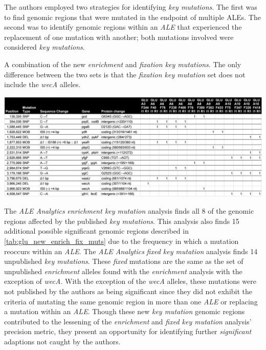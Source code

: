 \documentclass[12pt,final,masters,chapterheads]{ucsd}  %
\begin{document}
The authors employed two strategies for identifying \textit{key mutations}. The first was to find genomic regions that were mutated in the endpoint of multiple ALEs.
The second was to identify genomic regions within an \textit{ALE} that experienced the replacement of one mutation with another; both mutations involved were considered \textit{key mutations}.
\begin{table}[H]
  \caption{A combination of the new \textit{enrichment} and \textit{fixation key mutations}. The only difference between the two sets is that the \textit{fixation key mutation} set does not include the \textit{wecA} alleles.}
  \centering
  \includegraphics[width=\textwidth]{glu_new_enrich_fix_muts.png}
  \label{tab:glu_new_enrich_fix_muts}
\end{table}
The \textit{ALE Analytics }\textit{enrichment key mutation} analysis finds all 8 of the genomic regions affected by the published \textit{key mutations}. This analysis also finds 15 additional possible significant genomic regions described in \ref{tab:glu_new_enrich_fix_muts} due to the frequency in which a mutation reoccurs within an \textit{ALE}. The \textit{ALE Analytics} \textit{fixed key mutation} analysis finds 14 unpublished \textit{key mutations}. These \textit{fixed} mutations are the same as the set of unpublished \textit{enrichment} alleles found with the \textit{enrichment} analysis with the exception of \textit{wecA}. With the exception of the \textit{wecA} alleles, these mutations were not published by the authors as being significant since they did not exhibit the criteria of mutating the same genomic region in more than one \textit{ALE} or replacing a mutation within an \textit{ALE}. Though these new \textit{key mutation} genomic regions contributed to the lessening of the \textit{enrichment} and \textit{fixed key mutation} analysis' precision metric, they present an opportunity for identifying further \textit{significant} adaptions not caught by the authors.
\end{document}

